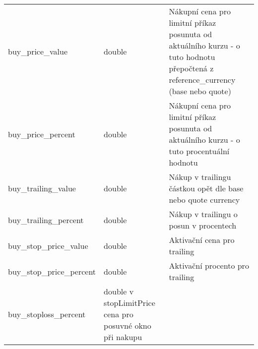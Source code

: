 \begin{center}
\begin{longtable}[h]{|l|C{4cm}|p{4cm}|}
        buy\_price\_value                     & double                                                                                                                                                           & Nákupní cena pro limitní příkaz posunuta od aktuálního kurzu - o tuto hodnotu přepočtená z reference\_currency (base nebo quote)  \\
        buy\_price\_percent                   & double                                                                                                                                                           & Nákupní cena pro limitní příkaz posunuta od aktuálního kurzu - o tuto procentuální hodnotu                                        \\
        buy\_trailing\_value                  & double                                                                                                                                                           & Nákup v trailingu částkou opět dle base nebo quote currency                                                                       \\
        buy\_trailing\_percent                & double                                                                                                                                                           & Nákup v trailingu o posun v procentech                                                                                            \\
        buy\_stop\_price\_value               & double                                                                                                                                                           & Aktivační cena pro trailing                                                                                                       \\
        buy\_stop\_price\_percent             & double                                                                                                                                                           & Aktivační procento pro trailing                                                                                                   \\
        buy\_stoploss\_percent                & double                      v                                                                                    stopLimitPrice cena pro posuvné okno při nakupu                                                                                                                                     \\

\end{longtable}
\end{center}
